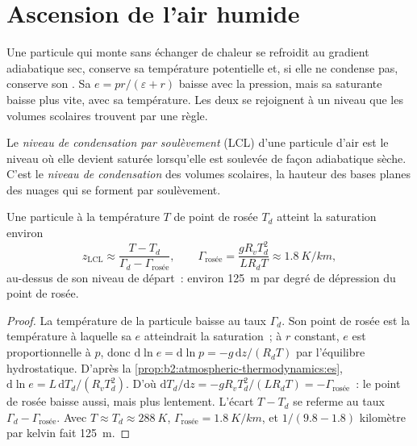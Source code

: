 \section{Ascension de l'air humide}\label{sec:b2:atmospheric-thermodynamics:ascent}

Une particule qui monte sans échanger de chaleur se refroidit au gradient adiabatique sec, conserve sa
température potentielle et, si elle ne condense pas, conserve son . Sa 
$e = pr/(\varepsilon + r)$ baisse avec la pression, mais sa  saturante baisse plus vite,
avec sa température. Les deux se rejoignent à un niveau que les volumes scolaires trouvent par une règle.

\begin{definition}\label{def:b2:atmospheric-thermodynamics:lcl}
Le \emph{niveau de condensation par soulèvement}
(LCL) d'une particule d'air est le niveau où elle devient saturée lorsqu'elle est soulevée de
façon adiabatique sèche. C'est le \emph{niveau de condensation}
des volumes scolaires, la hauteur des bases planes des nuages qui se forment par soulèvement.
\end{definition}

\begin{proposition}\label{prop:b2:atmospheric-thermodynamics:lcl}
Une particule à la température $T$ de point de rosée $T_d$ atteint la saturation environ
\[
  z_{\text{LCL}} \approx \frac{T - T_d}{\Gamma_d - \Gamma_{\text{rosée}}}, \qquad
  \Gamma_{\text{rosée}} = \frac{g R_v T_d^2}{L R_d T} \approx \qty{1.8}{K/km},
\]
au-dessus de son niveau de départ~: environ \qty{125}{m} par degré de dépression du point de rosée.
\end{proposition}

\begin{proof}
La température de la particule baisse au taux $\Gamma_d$. Son point de rosée est la température
à laquelle sa  $e$ atteindrait la saturation~; à $r$ constant, $e$ est
proportionnelle à $p$, donc $\mathrm{d}\ln e = \mathrm{d}\ln p = -g\,\mathrm{d}z/(R_dT)$ par l'équilibre
hydrostatique. D'après la \cref{prop:b2:atmospheric-thermodynamics:es},
$\mathrm{d}\ln e = L\,\mathrm{d}T_d/(R_vT_d^2)$. D'où $\mathrm{d}T_d/\mathrm{d}z = -gR_vT_d^2/(LR_dT) = -\Gamma_{\text{rosée}}$~:
le point de rosée baisse aussi, mais plus lentement. L'écart $T - T_d$ se referme
au taux $\Gamma_d - \Gamma_{\text{rosée}}$. Avec $T \approx T_d \approx \qty{288}{K}$,
$\Gamma_{\text{rosée}} = \qty{1.8}{K/km}$, et $1/(9.8 - 1.8)$ kilomètre par kelvin fait \qty{125}{m}.
\end{proof}

